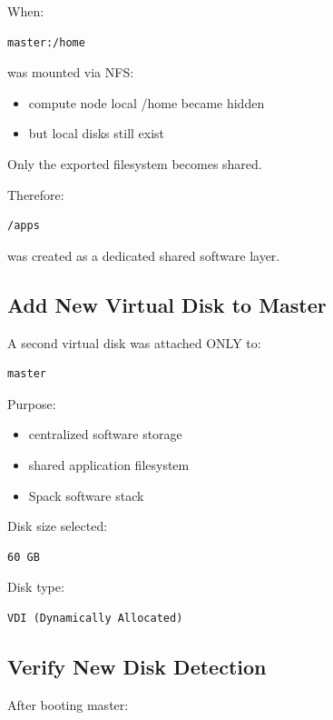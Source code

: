 \documentclass[11pt]{article}
\begin{document}
When:

\begin{verbatim}
master:/home
\end{verbatim}

was mounted via NFS:

\begin{itemize}
\item compute node local /home became hidden
\item but local disks still exist
\end{itemize}

Only the exported filesystem becomes shared.

Therefore:

\begin{verbatim}
/apps
\end{verbatim}

was created as a dedicated shared software layer.
\subsection{Add New Virtual Disk to Master}
\label{sec:org279b99a}

A second virtual disk was attached ONLY to:

\begin{verbatim}
master
\end{verbatim}

Purpose:

\begin{itemize}
\item centralized software storage
\item shared application filesystem
\item Spack software stack
\end{itemize}

Disk size selected:

\begin{verbatim}
60 GB
\end{verbatim}

Disk type:

\begin{verbatim}
VDI (Dynamically Allocated)
\end{verbatim}
\subsection{Verify New Disk Detection}
\label{sec:org473227a}

After booting master:
\end{document}

